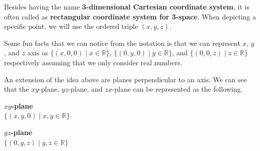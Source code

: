 \documentclass[../../../main.tex]{subfiles}
\begin{document}
Besides having the name \textbf{3-dimensional Cartesian coordinate
system}, it is often called as \textbf{rectangular coordinate system
for 3-space}. When depicting a specific point, we will use the
ordered triple $(x, y, z)$.

Some fun facts that we can notice from the notation is that we can
represent $x$, $y$, and $z$ axis as $\{ (x, 0, 0) \mid x \in
\mathbb{R} \}$, $\{ (0, y, 0) \mid y \in \mathbb{R} \}$, and
$\{ (0, 0, z) \mid z \in \mathbb{R} \}$ respectively assuming that
we only consider real numbers.

An extension of the idea above are planes perpendicular to an axis.
We can see that the $xy$-plane, $yz$-plane, and $zx$-plane can be
represented as the following.

\begin{minipage}{0.3\textwidth}
\begin{center}
\textbf{$xy$-plane} \\
$\{ (x, y, 0) \mid x, y \in \mathbb{R} \}$
\end{center}
\begin{figure}[H]
\centering
{}
\end{figure}
\end{minipage}
\hfill
\begin{minipage}{0.3\textwidth}
\begin{center}
\textbf{$yz$-plane} \\
$\{ (0, y, z) \mid y, z \in \mathbb{R} \}$
\end{center}
\begin{figure}[H]
\centering
{}
\end{figure}
\end{minipage}
\end{document}
